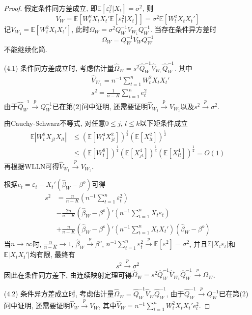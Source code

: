 \documentclass[cn,12pt,math=mtpro2,citestyle=gb7714-2015,bibstyle=gb7714-2015,twocol,mode=simple]{elegantbook}
\newcommand{\E}{\mathbb{E}}
\newcommand{\hbeta}{\hat{\beta}}
\begin{document}
\begin{proof}
    假定条件同方差成立, 即$\E[\varepsilon_t^2|X_t]=\sigma^2$, 则$$V_W=\E[W_t^2X_tX_t{'}\E[\varepsilon_t^2|X_t]]=\sigma^2\E[W_t^2X_tX_t']$$
    记$V_{W_1}=\E[W_t^2X_tX_t']$, 此时$\Omega_W=\sigma^2Q_W^{-1}V_{W_1}Q_W^{-1}$. 当存在条件异方差时
    $$\Omega_W=Q_W^{-1}V_WQ_W^{-1}$$
    不能继续化简.

    (4.1) 条件同方差成立时, 考虑估计量$\hat{\Omega}_{W}=s^2\hat{Q}_{W}^{-1}\hat{V}_{W_1}\hat{Q}_{W}^{-1}$. 其中
    \begin{align*}
    & \hat{V}_{W_1}=n^{-1}\sum_{t=1}^{n}W_t^2X_tX_t' \\
    & s^2=\frac{1}{n-K}\sum_{t=1}^{n}e_t^2
    \end{align*}
    由于$\hat{Q}_W^{-1}\xrightarrow{p}Q_W^{-1}$已在第(2)问中证明, 还需要证明$\hat{V}_{W_1}\xrightarrow{p}V_{W_1}$以及$s^2\xrightarrow{p}\sigma^2$.

    由Cauchy-Schwarz不等式, 对任意$0\leq j$, $l \leq k$以下矩条件成立
    \begin{align*}
    \E|W_t^2X_{jt}X_{lt}|&\leq(\E[W_t^4X_{jt}^2])^{\frac{1}{2}}(\E[X_{lt}^2])^{\frac{1}{2}} \\
    &\leq (\E[W_t^8])^{\frac{1}{4}}(\E[X_{jt}^4])^{\frac{1}{4}}(\E[X_{lt}^4])^{\frac{1}{2}}=O(1)
    \end{align*}
    再根据WLLN可得$\hat{V}_{W_1}\xrightarrow{p}V_{W_1}$.

    根据$e_t=\varepsilon_t-X_t'(\hbeta_W-\beta^o)$可得
    \begin{align*}
    s^2&=\frac{n}{n-K}\left(n^{-1}\sum_{t=1}^{n}\varepsilon_t^2\right) \\
    &-\frac{2n}{n-K}(\hbeta_W-\beta^o)'\left(n^{-1}\sum_{t=1}^{n}X_t\varepsilon_t\right) \\
    &+\frac{n}{n-K}(\hbeta_W-\beta^o)'\left(n^{-1}\sum_{t=1}^{n}X_tX_t'\right)(\hbeta_W-\beta^o)
    \end{align*}
    当$n\rightarrow\infty$时, $\displaystyle\frac{n}{n-K}\rightarrow 1$, $\hbeta_W\xrightarrow{p}\beta^o$, $\displaystyle n^{-1}\sum_{t=1}^{n}\varepsilon_t^2\xrightarrow{p}\E[\varepsilon^2]=\sigma^2$, 并且$\E|X_t\varepsilon_t|$和$\E|X_tX_t'|$均有限, 最终有$$s^2\xrightarrow{p}\sigma^2$$
    因此在条件同方差下, 由连续映射定理可得$\hat{\Omega}_{W}=s^2\hat{Q}_{W}^{-1}\hat{V}_{W_1}\hat{Q}_{W}^{-1}\xrightarrow{p}\Omega_W$.

    (4.2) 条件异方差成立时, 考虑估计量$\hat{\Omega}_{W}=\hat{Q}_W^{-1}\hat{V}_W\hat{Q}_W^{-1}$, 由于$\hat{Q}_W^{-1}\xrightarrow{p}Q_W^{-1}$已在第(2)问中证明, 还需要证明$\hat{V}_{W}\xrightarrow{p}V_{W}$, 其中$\displaystyle\hat{V}_W=n^{-1}\sum_{t=1}^{n}W_t^2X_tX_t'e_t^2$.


\end{proof}
\end{document}
